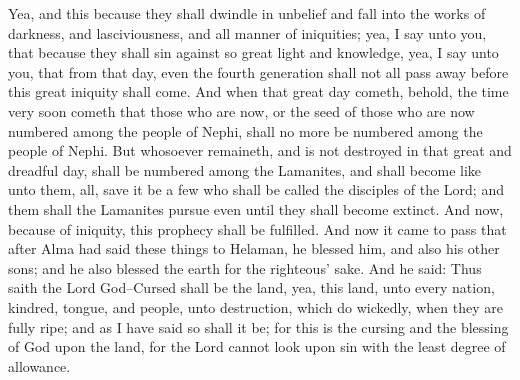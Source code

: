 Yea, and this because they shall dwindle in unbelief and fall into the works of darkness, and lasciviousness, and all manner of iniquities; yea, I say unto you, that because they shall sin against so great light and knowledge, yea, I say unto you, that from that day, even the fourth generation shall not all pass away before this great iniquity shall come.
\bverse \iffalse And when that great day cometh, behold, the time very soon cometh that those who are now, or the seed of those who are now numbered among the people of Nephi, shall no more be numbered among the people of Nephi. \fi
And when that great day cometh, behold, the time very soon cometh that those who are now, or the seed of those who are now numbered among the people of Nephi, shall no more be numbered among the people of Nephi.
\bverse \iffalse But whosoever remaineth, and is not destroyed in that great and dreadful day, shall be numbered among the Lamanites, and shall become like unto them, all, save it be a few who shall be called the disciples of the Lord; and them shall the Lamanites pursue even until they shall become extinct. And now, because of iniquity, this prophecy shall be fulfilled. \fi
But whosoever remaineth, and is not destroyed in that great and dreadful day, shall be numbered among the Lamanites, and shall become like unto them, all, save it be a few who shall be called the disciples of the Lord; and them shall the Lamanites pursue even until they shall become extinct. And now, because of iniquity, this prophecy shall be fulfilled.
\bverse \iffalse And now it came to pass that after Alma had said these things to Helaman, he blessed him, and also his other sons; and he also blessed the earth for the righteous' sake. \fi
And now it came to pass that after Alma had said these things to Helaman, he blessed him, and also his other sons; and he also blessed the earth for the righteous' sake.
\bverse \iffalse And he said: Thus saith the Lord God--Cursed shall be the land, yea, this land, unto every nation, kindred, tongue, and people, unto destruction, which do wickedly, when they are fully ripe; and as I have said so shall it be; for this is the cursing and the blessing of God upon the land, for the Lord cannot look upon sin with the least degree of allowance. \fi
And he said: Thus saith the Lord God--Cursed shall be the land, yea, this land, unto every nation, kindred, tongue, and people, unto destruction, which do wickedly, when they are fully ripe; and as I have said so shall it be; for this is the cursing and the blessing of God upon the land, for the Lord cannot look upon sin with the least degree of allowance.
